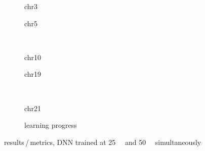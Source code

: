 \begin{figure}[p]%
    \begin{subfigure}{0.45\textwidth}
        \scriptsize 
        \caption{chr3}
    \end{subfigure} \hfill
    \begin{subfigure}{0.45\textwidth}
        \scriptsize
        \caption{chr5}
    \end{subfigure}\\[5mm]
    \begin{subfigure}{0.45\textwidth}
        \scriptsize
        \caption{chr10}
    \end{subfigure}\hfill
    \begin{subfigure}{0.45\textwidth}
        \scriptsize
        \caption{chr19}
    \end{subfigure}\\[3mm]
    \begin{subfigure}{0.45\textwidth}
        \scriptsize
        \caption{chr21} \label{fig:results:DNN_25_pearson_21}
    \end{subfigure}\hfill
    \begin{subfigure}{0.45\textwidth}
        \caption{learning progress} \label{fig:results:25plus50_lossEpochs}
    \end{subfigure}
    \caption{results\,/\,metrics, DNN trained at \SI{25}{\kilo\bp} and \SI{50}{\kilo\bp} simultaneously} \label{fig:results:DNN25plus50_pearson}
\end{figure}
